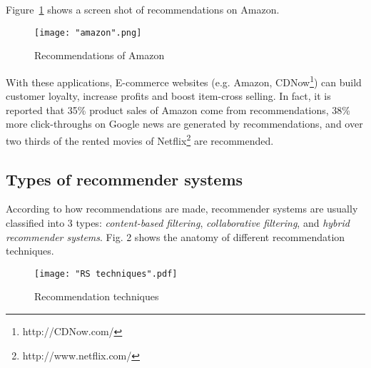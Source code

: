 \documentclass[oneside,13pt]{extreport}
\begin{document}
Figure~\ref{fig:amazon} shows a screen shot of recommendations on Amazon.
\clearpage
\begin{figure}[h!]
    \centering
    \texttt{[image: "amazon".png]} 
    \caption{Recommendations of Amazon}
    \label{fig:amazon}
\end{figure}


With these applications, E-commerce websites (e.g. Amazon, CDNow\footnote{http://CDNow.com/}) can build customer loyalty, increase profits and boost item-cross selling. In fact, it is reported that 35\% product sales of Amazon come from recommendations, 38\% more click-throughs on Google news are generated by recommendations, and over two thirds of the rented movies of Netflix\footnote{http://www.netflix.com/} are recommended\cite{Chevalier}.


\subsection{Types of recommender systems}
According to how recommendations are made, recommender systems are usually classified into 3 types\cite{Adomavicius, Balabanovic}: \emph{content-based filtering}, \emph{collaborative filtering}, and \emph{hybrid recommender systems}. Fig. 2 shows the anatomy of different recommendation techniques.
\clearpage
\begin{figure}[h!]
\centering
\texttt{[image: "RS techniques".pdf]}
\caption{Recommendation techniques}
\label{fig:RS_techniques}
\end{figure}
\end{document}

